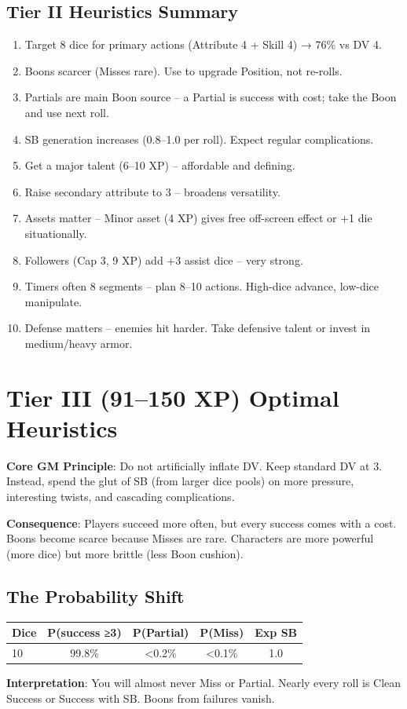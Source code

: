 \documentclass[11pt]{article}
\begin{document}
\subsection{Tier II Heuristics Summary}
\begin{enumerate}
    \item Target 8 dice for primary actions (Attribute 4 + Skill 4) → 76\% vs DV 4.
    \item Boons scarcer (Misses rare). Use to upgrade Position, not re-rolls.
    \item Partials are main Boon source – a Partial is success with cost; take the Boon and use next roll.
    \item SB generation increases (0.8–1.0 per roll). Expect regular complications.
    \item Get a major talent (6–10 XP) – affordable and defining.
    \item Raise secondary attribute to 3 – broadens versatility.
    \item Assets matter – Minor asset (4 XP) gives free off-screen effect or +1 die situationally.
    \item Followers (Cap 3, 9 XP) add +3 assist dice – very strong.
    \item Timers often 8 segments – plan 8–10 actions. High-dice advance, low-dice manipulate.
    \item Defense matters – enemies hit harder. Take defensive talent or invest in medium/heavy armor.
\end{enumerate}

\section{Tier III (91–150 XP) Optimal Heuristics}

\textbf{Core GM Principle}: Do not artificially inflate DV. Keep standard DV at 3. Instead, spend the glut of SB (from larger dice pools) on more pressure, interesting twists, and cascading complications.

\textbf{Consequence}: Players succeed more often, but every success comes with a cost. Boons become scarce because Misses are rare. Characters are more powerful (more dice) but more brittle (less Boon cushion).

\subsection{The Probability Shift}
\begin{table}[h]
\centering
\begin{tabular}{lcccc}
\toprule
\textbf{Dice} & \textbf{P(success ≥3)} & \textbf{P(Partial)} & \textbf{P(Miss)} & \textbf{Exp SB} \\
\midrule
10 & 99.8\% & <0.2\% & <0.1\% & 1.0 \\
\bottomrule
\end{tabular}
\end{table}
\textbf{Interpretation}: You will almost never Miss or Partial. Nearly every roll is Clean Success or Success with SB. Boons from failures vanish.
\end{document}
